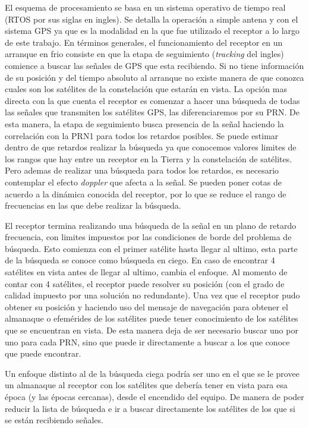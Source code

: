 \documentclass[a4paper,12pt,oneside,onecolumn,final,openright]{book}%
\begin{document}
	El esquema de procesamiento se basa en un sistema operativo de tiempo real (RTOS por sus siglas en ingles). Se detalla la operación a simple antena y con el sistema GPS ya que es la modalidad en la que fue utilizado el receptor a lo largo de este trabajo. En términos generales, el funcionamiento del receptor en un arranque en frio consiste en que la etapa de seguimiento (\textit{tracking} del ingles) comience a buscar las señales de GPS que esta recibiendo. Si no tiene información de su posición y del tiempo absoluto al arranque no existe manera de que conozca cuales son los satélites de la constelación que estarán en vista. La opción mas directa con la que cuenta el receptor es comenzar a hacer una búsqueda de todas las señales que transmiten los satélites GPS, las diferenciaremos por su PRN. De esta manera, la etapa de seguimiento busca presencia de la señal haciendo la correlación con la PRN1 para todos los retardos posibles. Se puede estimar dentro de que retardos realizar la búsqueda ya que conocemos valores limites de los rangos que hay entre un receptor en la Tierra y la constelación de satélites. Pero ademas de realizar una búsqueda para todos los retardos, es necesario contemplar el efecto \textit{doppler} que afecta a la señal. Se pueden poner cotas de acuerdo a la dinámica conocida del receptor, por lo que se reduce el rango de frecuencias en las que debe realizar la búsqueda.
	
	El receptor termina realizando una búsqueda de la señal en un plano de retardo frecuencia, con limites impuestos por las condiciones de borde del problema de búsqueda. Esto comienza con el primer satélite hasta llegar al ultimo, esta parte de la búsqueda se conoce como búsqueda en ciego. En caso de encontrar 4 satélites en vista antes de llegar al ultimo, cambia el enfoque. Al momento de contar con 4 satélites, el receptor puede resolver su posición (con el grado de calidad impuesto por una solución no redundante). Una vez que el receptor pudo obtener su posición y haciendo uso del mensaje de navegación para obtener el almanaque o efemérides de los satélites puede tener conocimiento de los satélites que se encuentran en vista. De esta manera deja de ser necesario buscar uno por uno para cada PRN, sino que puede ir directamente a buscar a los que conoce que puede encontrar.
	
	Un enfoque distinto al de la búsqueda ciega podría ser uno en el que se le provee un almanaque al receptor con los satélites que debería tener en vista para esa época (y las épocas cercanas), desde el encendido del equipo. De manera de poder reducir la lista de búsqueda e ir a buscar directamente los satélites de los que si se están recibiendo señales.
	
\end{document}
